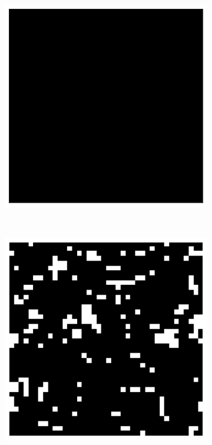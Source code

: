 \documentclass[11pt, a4paper]{report} %
\begin{document}
\begin{figure}[htb]
	\centering
	\begin{subfigure}[c]{0.2\linewidth}
		\includegraphics[width=\linewidth]{20160603124433_40_by_40_Lattice_step0.pdf}
	\end{subfigure}
	~
	\begin{subfigure}[c]{0.2\linewidth}
		\includegraphics[width=\linewidth]{20160603125613_40_by_40_Lattice_step10.pdf}

\end{subfigure}
\end{figure}
\end{document}
